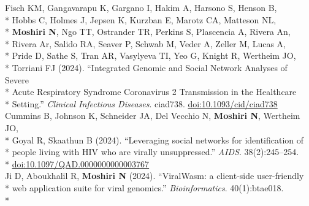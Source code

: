 \documentclass[margin,line]{res}
\begin{document}
\begin{resume}
\hspace*{9.5mm} Fisch KM, Gangavarapu K, Gargano I, Hakim A, Harsono S, Henson B,\\*
\hspace*{9.5mm} Hobbs C, Holmes J, Jepsen K, Kurzban E, Marotz CA, Matteson NL,\\*
\hspace*{9.5mm} \textbf{Moshiri N}, Ngo TT, Ostrander TR, Perkins S, Plascencia A, Rivera An,\\*
\hspace*{9.5mm} Rivera Ar, Salido RA, Seaver P, Schwab M, Veder A, Zeller M, Lucas A,\\*
\hspace*{9.5mm} Pride D, Sathe S, Tran AR, Vasylyeva TI, Yeo G, Knight R, Wertheim JO,\\*
\hspace*{9.5mm} Torriani FJ (2024). ``Integrated Genomic and Social Network Analyses of Severe\\*
\hspace*{9.5mm} Acute Respiratory Syndrome Coronavirus 2 Transmission in the Healthcare\\*\vspace{2mm}
\hspace*{8mm} Setting.'' \textit{Clinical Infectious Diseases}. ciad738. \href{https://doi.org/10.1093/cid/ciad738}{doi:10.1093/cid/ciad738}\\
\hspace*{4mm} Cummins B, Johnson K, Schneider JA, Del Vecchio N, \textbf{Moshiri N}, Wertheim JO,\\*
\hspace*{9.5mm} Goyal R, Skaathun B (2024). ``Leveraging social networks for identification of\\*
\hspace*{9.5mm} people living with HIV who are virally unsuppressed.'' \textit{AIDS}. 38(2):245--254.\\*\vspace{2mm}
\hspace*{8mm} \href{https://doi.org/10.1097/QAD.0000000000003767}{doi:10.1097/QAD.0000000000003767}\\
\hspace*{4mm} Ji D, Aboukhalil R, \textbf{Moshiri N} (2024). ``ViralWasm: a client-side user-friendly\\*
\hspace*{9.5mm} web application suite for viral genomics.'' \textit{Bioinformatics}. 40(1):btae018.\\*\vspace{2mm}

\end{resume}
\end{document}
